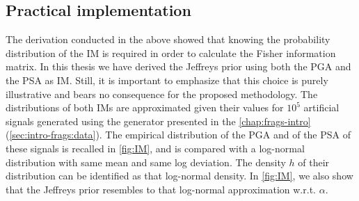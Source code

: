     \subsection{Practical implementation}\label{sec:PREM:subsec-jeffprectical}



    The derivation conducted in the above showed that knowing the probability distribution of the IM is required in order to calculate the Fisher information matrix. %
    In this thesis we have derived the Jeffreys prior using both the PGA and the PSA as IM.
    {Still, it is important to emphasize that this choice is purely illustrative and bears no consequence for the proposed methodology.} 
    The distributions of both IMs are approximated given their values for $10^5$ artificial signals generated using the generator presented in the \cref{chap:frags-intro} (\cref{sec:intro-frags:data}).
    The empirical distribution of the PGA and of the PSA of these signals is recalled in \cref{fig:IM}, and is compared with a log-normal distribution with same mean and same log deviation. 
    The density $h$ of their distribution can be identified as that log-normal density. 
    In \cref{fig:IM}, we also show that the Jeffreys prior resembles to that log-normal approximation w.r.t. $\alpha$.


